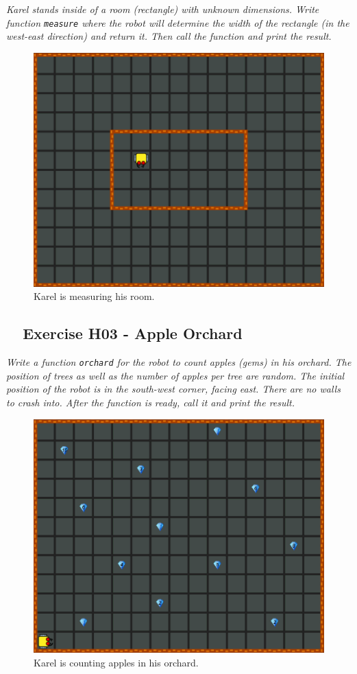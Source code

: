 {{{{{\em Karel stands inside of a room (rectangle) with unknown dimensions. Write function {\tt measure}  
where the robot will determine the width of the rectangle (in the west-east direction) and return it. 
Then call the function and print the result.}

\begin{figure}[!ht]
\begin{center}
\includegraphics[height=0.4\textwidth]{imgk/h02.png}
\end{center}
\vspace{-4mm}
\caption{Karel is measuring his room.}
\label{fig:h02}
\vspace{-4mm}
\end{figure}
\noindent

\subsection{\ \ Exercise H03 - Apple Orchard}

{\em Write a function {\tt orchard} for the robot to count apples (gems) in his orchard. The position of 
trees as well as the number of apples per tree are random. The initial position of the robot is 
in the south-west corner, facing east. There are no walls
to crash into. After the function is ready, call it and print the result.}

\begin{figure}[!ht]
\begin{center}
\includegraphics[height=0.4\textwidth]{imgk/h03.png}
\end{center}
\vspace{-4mm}
\caption{Karel is counting apples in his orchard.}
\label{fig:h03}
\vspace{-4mm}
\end{figure}
\noindent

}}}}
